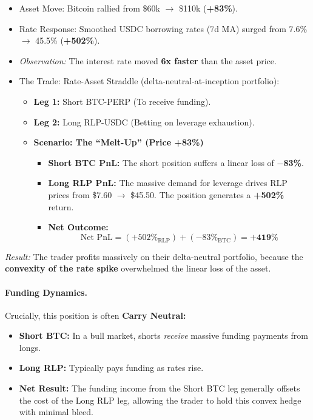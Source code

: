 \documentclass[12pt]{article}
\begin{document}
\begin{itemize}
    \item Asset Move: Bitcoin rallied from \$60k $\rightarrow$ \$110k (\textbf{+83\%}).
    \item Rate Response: Smoothed USDC borrowing rates (7d MA) surged from 7.6\% $\rightarrow$ 45.5\% (\textbf{+502\%}).
    \item \emph{Observation:} The interest rate moved \textbf{6x faster} than the asset price.
    \item The Trade: Rate-Asset Straddle (delta-neutral-at-inception portfolio):
    \begin{itemize}
        \item \textbf{Leg 1:} Short BTC-PERP (To receive funding).
        \item \textbf{Leg 2:} Long RLP-USDC (Betting on leverage exhaustion).
        \item \textbf{Scenario: The ``Melt-Up'' (Price +83\%)}
        \begin{itemize}
            \item \textbf{Short BTC PnL:} The short position suffers a linear loss of \textbf{$-$83\%}.
            \item \textbf{Long RLP PnL:} The massive demand for leverage drives RLP prices from \$7.60 $\rightarrow$ \$45.50. The position generates a \textbf{+502\%} return.
            \item \textbf{Net Outcome:}
            \begin{equation}
                \text{Net PnL} = (+502\%_{\text{RLP}}) + (-83\%_{\text{BTC}}) = \mathbf{+419\%}
            \end{equation}
        \end{itemize}
    \end{itemize}
\end{itemize}

\emph{Result:} The trader profits massively on their delta-neutral portfolio, because the \textbf{convexity of the rate spike} overwhelmed the linear loss of the asset.

\paragraph{Funding Dynamics.}
Crucially, this position is often \textbf{Carry Neutral:}

\begin{itemize}
    \item \textbf{Short BTC:} In a bull market, shorts \emph{receive} massive funding payments from longs.
    \item \textbf{Long RLP:} Typically pays funding as rates rise.
    \item \textbf{Net Result:} The funding income from the Short BTC leg generally offsets the cost of the Long RLP leg, allowing the trader to hold this convex hedge with minimal bleed.
\end{itemize}
\end{document}
